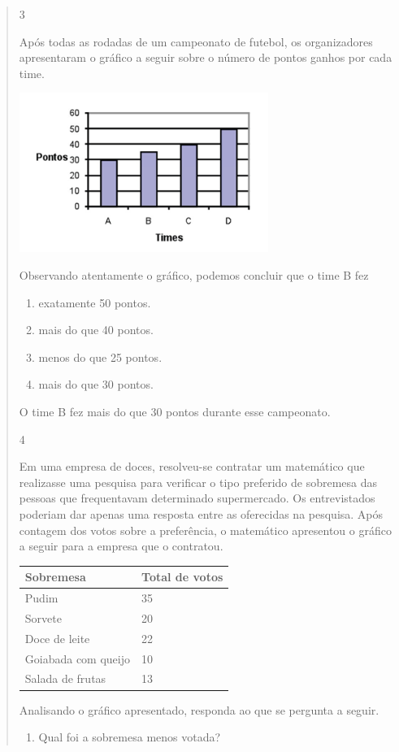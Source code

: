 \begin{mdframed}[linewidth=2pt,linecolor=salmao,roundcorner=2pt]
\begin{itemize}
{\begin{itemize}
\begin{escolha}
{\begin{quote}
{\begin{escolha}
{{{\num{3}

Após todas as rodadas de um campeonato de futebol, os organizadores
apresentaram o gráfico a seguir sobre o número de pontos ganhos por cada
time.

\includegraphics[width=3.19194in,height=2.04184in]{media/image96.png}

Observando atentamente o gráfico, podemos concluir que o time B fez

\begin{enumerate}
\item
  exatamente 50 pontos.
\item
  mais do que 40 pontos.
\item
  menos do que 25 pontos.
\item
  mais do que 30 pontos.
\end{enumerate}

O time B fez mais do que 30 pontos durante esse campeonato.

\num{4}

Em uma empresa de doces, resolveu-se contratar um matemático que realizasse uma
pesquisa para verificar o tipo preferido de sobremesa das pessoas que
frequentavam determinado supermercado. Os entrevistados poderiam dar
apenas uma resposta entre as oferecidas na pesquisa. Após contagem dos
votos sobre a preferência, o matemático apresentou o gráfico a seguir
para a empresa que o contratou.

\begin{longtable}[]{@{}ll@{}}
\toprule
Sobremesa & Total de votos\tabularnewline
\midrule
\endhead
Pudim & 35\tabularnewline
Sorvete & 20\tabularnewline
Doce de leite & 22\tabularnewline
Goiabada com queijo & 10\tabularnewline
Salada de frutas & 13\tabularnewline
\bottomrule
\end{longtable}

Analisando o gráfico apresentado, responda ao que se pergunta a seguir.

\begin{enumerate}
\item
  Qual foi a sobremesa menos votada?
\end{enumerate}

}}}
\end{escolha}}
\end{quote}}
\end{escolha}
\end{itemize}}
\end{itemize}
\end{mdframed}
